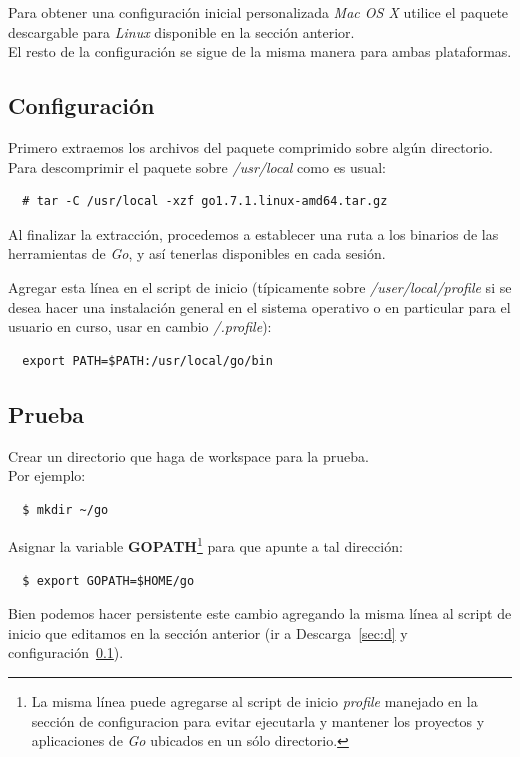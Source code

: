\documentclass[12pt]{article}
\begin{document}
Para obtener una configuración inicial personalizada \textit{Mac OS X} utilice el paquete descargable para \textit{Linux} disponible en la sección anterior.\\

El resto de la configuración se sigue de la misma manera para ambas plataformas.

\subsection{Configuración}\label{sec:c}
Primero extraemos los archivos del paquete comprimido sobre algún directorio.\\
Para descomprimir el paquete sobre \textit{/usr/local} como es usual:
\begin{verbatim}
  # tar -C /usr/local -xzf go1.7.1.linux-amd64.tar.gz
\end{verbatim}
Al finalizar la extracción, procedemos a establecer una ruta a los binarios de las herramientas de \textit{Go}, y así tenerlas disponibles en cada sesión.\par
Agregar esta línea en el script de inicio (típicamente sobre \textit{/user/local/profile}
si se desea hacer una instalación general en el sistema operativo o
en particular para el usuario en curso, usar en cambio \textit{/.profile}):
\begin{verbatim}
  export PATH=$PATH:/usr/local/go/bin
\end{verbatim}

\subsection{Prueba}
Crear un directorio que haga de workspace para la prueba.\\
Por ejemplo:
\begin{verbatim}
  $ mkdir ~/go
\end{verbatim}
Asignar la variable \textbf{GOPATH}\footnote{La misma línea puede agregarse al script de inicio \textit{profile} manejado en la sección de configuracion para evitar ejecutarla y mantener los proyectos y aplicaciones de \textit{Go} ubicados en un sólo directorio.}
para que apunte a tal dirección:
\begin{verbatim}
  $ export GOPATH=$HOME/go
\end{verbatim}
Bien podemos hacer persistente este cambio agregando la misma línea al script
de inicio que editamos en la sección anterior (ir a Descarga~\ref{sec:d} y configuración~\ref{sec:c}). \par
\end{document}
